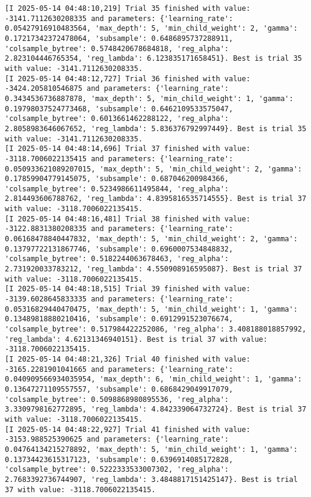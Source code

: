 \documentclass[
  letterpaper,
  DIV=11,
  numbers=noendperiod]{scrreprt}
\begin{document}
\begin{verbatim}
[I 2025-05-14 04:48:10,219] Trial 35 finished with value: -3141.7112630208335 and parameters: {'learning_rate': 0.05427916910483564, 'max_depth': 5, 'min_child_weight': 2, 'gamma': 0.17217342372478064, 'subsample': 0.6486895737288911, 'colsample_bytree': 0.5748420678684818, 'reg_alpha': 2.823104446765354, 'reg_lambda': 6.123835171658451}. Best is trial 35 with value: -3141.7112630208335.
[I 2025-05-14 04:48:12,727] Trial 36 finished with value: -3424.205810546875 and parameters: {'learning_rate': 0.3434536736887878, 'max_depth': 5, 'min_child_weight': 1, 'gamma': 0.19798037524773468, 'subsample': 0.6462109533575047, 'colsample_bytree': 0.6013661462288122, 'reg_alpha': 2.8058983646067652, 'reg_lambda': 5.836376792997449}. Best is trial 35 with value: -3141.7112630208335.
[I 2025-05-14 04:48:14,696] Trial 37 finished with value: -3118.7006022135415 and parameters: {'learning_rate': 0.050933621089207015, 'max_depth': 5, 'min_child_weight': 2, 'gamma': 0.17859904779145075, 'subsample': 0.687046200984366, 'colsample_bytree': 0.5234986611495844, 'reg_alpha': 2.814493606788762, 'reg_lambda': 4.8395816535714555}. Best is trial 37 with value: -3118.7006022135415.
[I 2025-05-14 04:48:16,481] Trial 38 finished with value: -3122.8831380208335 and parameters: {'learning_rate': 0.06168478840447832, 'max_depth': 5, 'min_child_weight': 2, 'gamma': 0.13797722131867746, 'subsample': 0.6960007534848832, 'colsample_bytree': 0.5182244063678463, 'reg_alpha': 2.731920033783212, 'reg_lambda': 4.550908916595087}. Best is trial 37 with value: -3118.7006022135415.
[I 2025-05-14 04:48:18,515] Trial 39 finished with value: -3139.6028645833335 and parameters: {'learning_rate': 0.05316829440470475, 'max_depth': 5, 'min_child_weight': 1, 'gamma': 0.13489818880210416, 'subsample': 0.6912991523076674, 'colsample_bytree': 0.517984422252086, 'reg_alpha': 3.408188018857992, 'reg_lambda': 4.62131346940151}. Best is trial 37 with value: -3118.7006022135415.
[I 2025-05-14 04:48:21,326] Trial 40 finished with value: -3165.2281901041665 and parameters: {'learning_rate': 0.040909566934035954, 'max_depth': 6, 'min_child_weight': 1, 'gamma': 0.13647271109557557, 'subsample': 0.6868429049917079, 'colsample_bytree': 0.5098868980895536, 'reg_alpha': 3.3309798162772895, 'reg_lambda': 4.842339064732724}. Best is trial 37 with value: -3118.7006022135415.
[I 2025-05-14 04:48:22,927] Trial 41 finished with value: -3153.988525390625 and parameters: {'learning_rate': 0.04764134215278892, 'max_depth': 5, 'min_child_weight': 1, 'gamma': 0.13734423615317123, 'subsample': 0.6396914085172828, 'colsample_bytree': 0.5222333533007302, 'reg_alpha': 2.7683392736744907, 'reg_lambda': 3.4848817151425147}. Best is trial 37 with value: -3118.7006022135415.

\end{verbatim}
\end{document}
